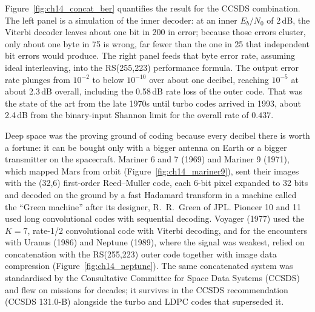 Figure~\ref{fig:ch14_concat_ber} quantifies the result for the CCSDS combination. The left panel is a
simulation of the inner decoder: at an inner $E_b/N_0$ of 2\,dB, the Viterbi decoder leaves about one
bit in 200 in error; because those errors cluster, only about one byte in 75 is wrong, far fewer than the
one in 25 that independent bit errors would produce. The right panel feeds
that byte error rate, assuming ideal interleaving, into the RS(255,223) performance
formula. The output error rate plunges from $10^{-2}$ to below $10^{-10}$ over about one decibel,
reaching $10^{-5}$ at about 2.3\,dB overall, including the 0.58\,dB rate loss of the outer code.
That was the state of the art from the late 1970s until turbo codes arrived in 1993, about 2.4\,dB
from the binary-input Shannon limit for the overall rate of $0.437$.



\begin{history}
Deep space was the proving ground of coding because every decibel there is worth a fortune: it can
be bought only with a bigger antenna on Earth or a bigger transmitter on the spacecraft. Mariner 6
and 7 (1969) and Mariner 9 (1971), which mapped Mars from orbit (Figure~\ref{fig:ch14_mariner9}), sent
their images with the (32,6) first-order Reed--Muller code, each 6-bit pixel expanded to 32 bits and
decoded on the ground by a fast Hadamard transform in a machine called the ``Green machine'' after
its designer, R.~R.~Green of JPL. Pioneer 10 and 11 used long convolutional codes with sequential
decoding. Voyager (1977) used the $K=7$, rate-1/2 convolutional code with Viterbi decoding, and for
the encounters with Uranus (1986) and Neptune (1989), where the signal was weakest, relied on
concatenation with the RS(255,223) outer code together with image data compression
(Figure~\ref{fig:ch14_neptune}). The same concatenated system was standardised by the Consultative
Committee for Space Data Systems (CCSDS) and flew on missions for decades; it survives in the CCSDS
recommendation (CCSDS 131.0-B) alongside the turbo and LDPC codes that superseded it.
\end{history}

